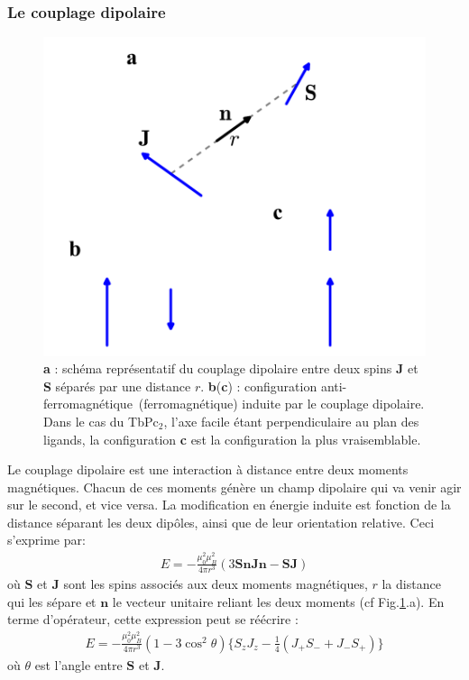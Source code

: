 \subsubsection{Le couplage dipolaire}

\begin{figure}
\parbox{6.5cm}{
\includegraphics[scale=0.45]{Resultats/CDipolaire/CDipolaire.pdf} 
}
\parbox{7cm}{\caption{\textbf{a} : schéma représentatif du couplage dipolaire entre deux spins \textbf{J} et \textbf{S} séparés par une distance $r$. \textbf{b}(\textbf{c}) : configuration anti-ferromagnétique~(ferromagnétique) induite par le couplage dipolaire. Dans le cas du TbPc$_2$, l'axe facile étant perpendiculaire au plan des ligands, la configuration \textbf{c} est la configuration la plus vraisemblable.}
\label{dipolaire}
}
\end{figure}


Le couplage dipolaire est une interaction à distance entre deux moments magnétiques. Chacun de ces moments génère un champ dipolaire qui va venir agir sur le second, et vice versa. La modification en énergie induite est fonction de la distance séparant les deux dipôles, ainsi que de leur orientation relative. Ceci s'exprime par:
\begin{eqnarray}
E = -\frac{\mu_0^2 \mu_B^2}{4\pi r^3}(3\mathbf{SnJn} - \mathbf{SJ}) \nonumber
\end{eqnarray}
où $\mathbf{S}$ et $\mathbf{J}$ sont les spins associés aux deux moments magnétiques, $r$ la distance qui les sépare et $\mathbf{n}$ le vecteur unitaire reliant les deux moments (cf Fig.\ref{dipolaire}.a). En terme d'opérateur, cette expression peut se réécrire :
\begin{eqnarray}
E = -\frac{\mu_0^2 \mu_B^2}{4\pi r^3}(1 - 3 \cos^2 \theta) \lbrace S_zJ_z - \frac{1}{4}(J_+S_- + J_-S_+)\rbrace \nonumber
\end{eqnarray}
où $\theta$ est l'angle entre $\mathbf{S}$ et $\mathbf{J}$.

